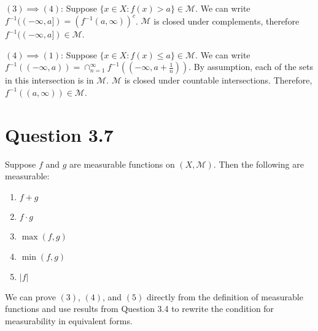 \documentclass{article}
\begin{document}
      $(3) \implies (4)$:  
      \newline
      Suppose $\{x \in X : f(x) > a \} \in \mathcal{M}$. We can write $f^{-1}((-\infty, a]) = (f^{-1}(a, \infty))^c$. $\mathcal{M}$
      is closed under complements, therefore $f^{-1}((-\infty, a]) \in \mathcal{M}$.
      \newline
    \newline

      $(4) \implies (1)$: 
      \newline
      Suppose $\{x \in X : f(x) \leq a \} \in \mathcal{M}$. We can write $f^{-1}((-\infty, a)) = \cap_{n=1}^{\infty} f^{-1}((-\infty, a + \frac{1}{n}))$.
      By assumption, each of the sets in this intersection is in $\mathcal{M}$. $\mathcal{M}$
      is closed under countable intersections. Therefore, $f^{-1}((a, \infty)) \in \mathcal{M}$.



    \section*{Question 3.7}
    Suppose $f$ and $g$ are measurable functions on $(X,\mathcal{M})$. Then the following are measurable:
    \begin{enumerate}
    	\item $f + g$
    	\item $f \cdot g$
    	\item $\max(f,g)$
    	\item $\min(f,g)$
    	\item $|f|$
    \end{enumerate}

    We can prove $(3)$, $(4)$, and $(5)$ directly from the definition of measurable functions and use results from Question 3.4 to rewrite the condition for measurability in equivalent forms.
\end{document}
